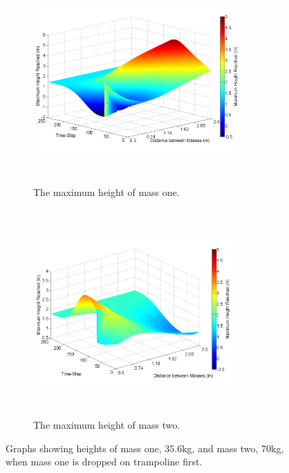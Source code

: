 \begin{figure}[H]
	\centering
    \begin{subfigure}{0.45\textwidth}
		\includegraphics[width=3.1in, height=3.1in]{m1_on_tramp_different_masses_m1.png}
    	\caption{The maximum height of mass one.}\label{fig:m1m1}
    \end{subfigure}\hfill
	\begin{subfigure}{0.45\textwidth}
		\includegraphics[width=3.1in, height=3.1in]{m1_on_tramp_different_masses_m2.png}
    	\caption{The maximum height of mass two.}\label{fig:m1m2}
    \end{subfigure}\hfill
    \caption{Graphs showing heights of mass one, 35.6kg, and mass two, 70kg, when mass one is dropped on trampoline first.}\label{fig:m1on3d}
\end{figure}

